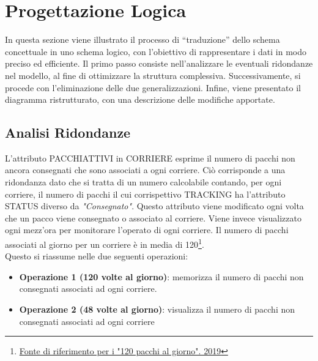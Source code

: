 \section{Progettazione Logica}

In questa sezione viene illustrato il processo di “traduzione” dello schema concettuale in uno schema logico, con l’obiettivo di rappresentare i dati in modo preciso
ed efficiente. Il primo passo consiste nell’analizzare le eventuali ridondanze nel modello, al fine di ottimizzare la struttura complessiva. Successivamente, si procede
con l’eliminazione delle due generalizzazioni. Infine, viene presentato il diagramma
ristrutturato, con una descrizione delle modifiche apportate.

\subsection{Analisi Ridondanze}

L'attributo PACCHIATTIVI in CORRIERE esprime il numero di pacchi non ancora consegnati che sono associati a ogni corriere. Ciò corrisponde a una ridondanza dato che si tratta di un numero calcolabile contando, per ogni corriere, il numero di pacchi il cui corrispettivo TRACKING ha l'attributo STATUS diverso da \textit{"Consegnato"}.
Questo attributo viene modificato ogni volta che un pacco viene consegnato o associato al corriere. Viene invece visualizzato ogni mezz'ora per monitorare l'operato di ogni corriere. Il numero di pacchi associati al giorno per un corriere è in media di 120\footnote{\href{https://www.dire.it/26-02-2019/301816-video-a-milano-la-rabbia-dei-corrieri-di-amazon-quattro-minuti-a-consegna-troppo-pochi/}{Fonte di riferimento per i "120 pacchi al giorno". 2019}}.\\
Questo si riassume nelle due seguenti operazioni:
\begin{itemize}
    \item \textbf{Operazione 1 (120 volte al giorno)}: memorizza il numero di pacchi non consegnati associati ad ogni corriere.
    \item \textbf{Operazione 2 (48 volte al giorno)}: visualizza il numero di pacchi non consegnati associati ad ogni corriere
\end{itemize}


